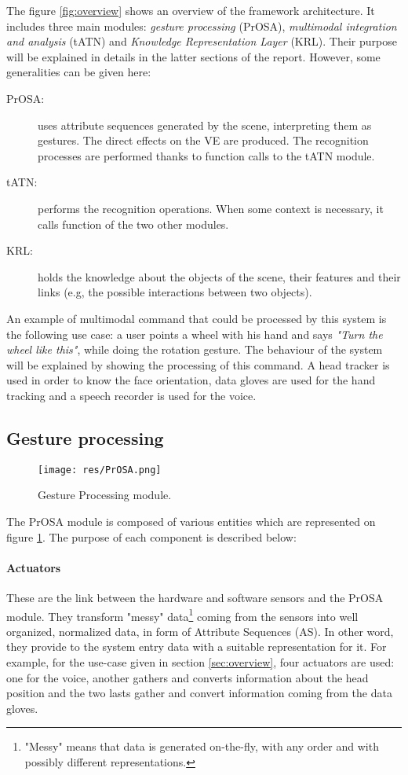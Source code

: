 \documentclass[a4paper]{article}
\begin{document}
The figure \ref{fig:overview} shows an overview of the framework architecture. It includes three main modules: \textit{gesture processing} (PrOSA), \textit{multimodal integration and analysis} (tATN) and \textit{Knowledge Representation Layer} (KRL). Their purpose will be explained in details in the latter sections of the report. However, some generalities can be given here:
\begin{description}
	\item[PrOSA:] uses attribute sequences generated by the scene, interpreting them as gestures. The direct effects on the VE are produced. The recognition processes are performed thanks to function calls to the tATN module.
	\item[tATN:] performs the recognition operations. When some context is necessary, it calls function of the two other modules.
	\item[KRL:] holds the knowledge about the objects of the scene, their features and their links (e.g, the possible interactions between two objects).
\end{description}

An example of multimodal command that could be processed by this system is the following use case: a user points a wheel with his hand and says \textit{"Turn the wheel like this"}, while doing the rotation gesture. The behaviour of the system will be explained by showing the processing of this command. A head tracker is used in order to know the face orientation, data gloves are used for the hand tracking and a speech recorder is used for the voice.

\subsection{Gesture processing}

\begin{figure}
\centering
\texttt{[image: res/PrOSA.png]}
\caption{\label{fig:PrOSA}Gesture Processing module.}
\end{figure}

The PrOSA module is composed of various entities which are represented on figure \ref{fig:PrOSA}. The purpose of each component is described below:

\paragraph{Actuators} These are the link between the hardware and software sensors and the PrOSA module. They transform "messy" data\footnote{"Messy" means that data is generated on-the-fly, with any order and with possibly different representations.} coming from the sensors into well organized, normalized data, in form of Attribute Sequences (AS). In other word, they provide to the system entry data with a suitable representation for it. For example, for the use-case given in section \ref{sec:overview}, four actuators are used: one for the voice, another gathers and converts information about the head position and the two lasts gather and convert information coming from the data gloves.
\end{document}
